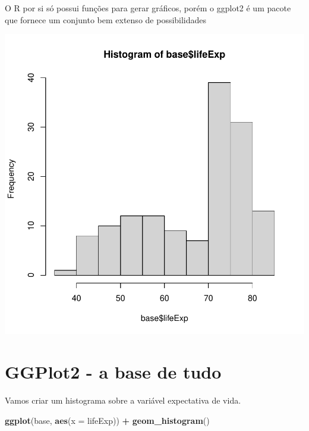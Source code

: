 \documentclass[
]{article}
\newenvironment{Shaded}{\begin{snugshade}}{\end{snugshade}}
\newcommand{\DataTypeTok}[1]{\textcolor[rgb]{0.13,0.29,0.53}{#1}}
\newcommand{\KeywordTok}[1]{\textcolor[rgb]{0.13,0.29,0.53}{\textbf{#1}}}
\newcommand{\NormalTok}[1]{#1}
\newcommand{\OperatorTok}[1]{\textcolor[rgb]{0.81,0.36,0.00}{\textbf{#1}}}
\newcommand{\StringTok}[1]{\textcolor[rgb]{0.31,0.60,0.02}{#1}}
\begin{document}
O R por si só possui funções para gerar gráficos, porém o ggplot2 é um
pacote que fornece um conjunto bem extenso de possibilidades

\begin{Shaded}
\end{Shaded}

\begin{center}\includegraphics{arquivo_pdf_files/figure-latex/histograma1-1} \end{center}

\hypertarget{ggplot2---a-base-de-tudo-1}{%
\section{GGPlot2 - a base de tudo}\label{ggplot2---a-base-de-tudo-1}}

Vamos criar um histograma sobre a variável expectativa de vida.

\begin{Shaded}
\begin{Highlighting}[]
\KeywordTok{ggplot}\NormalTok{(base, }\KeywordTok{aes}\NormalTok{(}\DataTypeTok{x =}\NormalTok{ lifeExp)) }\OperatorTok{+}\StringTok{ }\KeywordTok{geom_histogram}\NormalTok{()}
\end{Highlighting}
\end{Shaded}
\end{document}
